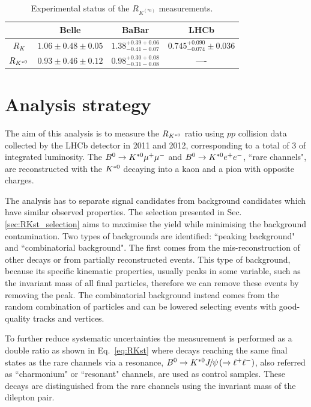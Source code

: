 \begin{center}
\begin{table}[h!]
\label{expstatus}
\centering
\caption{Experimental status of the $R_{K^{(*0)}}$ measurements. } %
\begin{tabular}{c|c|c|c}
 	& Belle 			& BaBar 		& LHCb \\
 \hline
$R_K$			& $1.06 \pm 0.48 \pm 0.05$	& $1.38^{+0.39+0.06}_{-0.41-0.07}$ & $0.745^{+0.090}_{-0.074} \pm 0.036$\\
$R_{{{K}^{*0}}}$	& $0.93 \pm 0.46 \pm 0.12$	& $0.98^{+0.30+0.08}_{-0.31-0.08}$ & ----\\
\end{tabular}
\end{table}
\end{center}


\section{Analysis strategy}

The aim of this analysis is to measure the $R_{{{K}^{*0}}}$ ratio using $pp$ collision data collected by the LHCb
detector in 2011 and 2012, corresponding to a total of 3 \invfb of integrated luminosity.
The ${{B}^0} \rightarrow {\ensuremath{{K}^{*0}}}{\ensuremath{\mu^+\mu^-}}$ and ${{B}^0} \rightarrow {\ensuremath{{K}^{*0}}}{\ensuremath{e^+e^-}}$, ``rare channels", are
reconstructed with the ${{K}^{*0}}$ decaying into a kaon and a pion with opposite charges.

The analysis has to separate signal candidates from background candidates which have similar observed properties. 
The selection presented in Sec. \ref{sec:RKst_selection} aims to maximise the yield while minimising
the background contamination. Two types of backgrounds are identified: ``peaking background" and ``combinatorial background". 
The first comes from the mis-reconstruction of other decays or from partially reconstructed events. This type 
of background,  because its specific kinematic properties, usually peaks in some variable, such as the invariant
mass of all final particles, therefore we can remove these events by removing the peak. 
The combinatorial background  instead comes from the random combination of particles and can 
be lowered selecting events with good-quality tracks and vertices.

To further reduce systematic uncertainties the measurement is performed as a double ratio as shown in
Eq.~\ref{eq:RKst} %
where decays reaching the same final states as the rare channels via a \jpsi resonance, $\Bz\to\Kstarz\jpsi(\to\ll)$,
also referred as ``charmonium" or ``resonant" channels, are used as control samples.
These decays are distinguished from the rare channels using the invariant mass of the dilepton pair.

